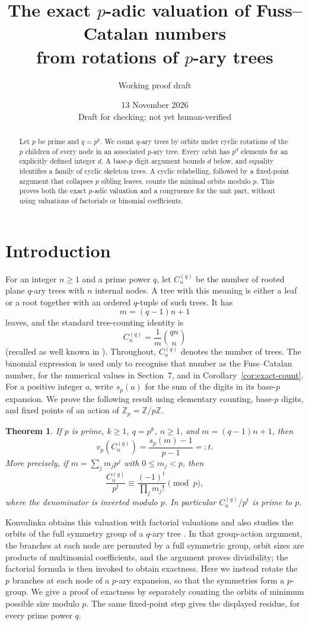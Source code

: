 \documentclass[11pt]{amsart}
\title[Tree rotations and Fuss--Catalan numbers]{The exact $p$-adic valuation of Fuss--Catalan numbers\\from rotations of $p$-ary trees}
\author{Working proof draft}
\date{13 November 2026\\\small Draft for checking; not yet human-verified}
\newtheorem{theorem}{Theorem}[section]
\theoremstyle{definition}
\theoremstyle{remark}
\newcommand{\Z}{\mathbb Z}
\newcommand{\fc}{C_n^{(q)}}
\begin{document}
\begin{abstract}
Let $p$ be prime and $q=p^k$.  We count $q$-ary trees by orbits under cyclic rotations of the $p$ children of every node in an associated $p$-ary tree.  Every orbit has $p^d$ elements for an explicitly defined integer $d$.  A base-$p$ digit argument bounds $d$ below, and equality identifies a family of cyclic skeleton trees.  A cyclic relabelling, followed by a fixed-point argument that collapses $p$ sibling leaves, counts the minimal orbits modulo $p$.  This proves both the exact $p$-adic valuation and a congruence for the unit part, without using valuations of factorials or binomial coefficients.
\end{abstract}
\maketitle
\tableofcontents

\section{Introduction}
For an integer $n\ge 1$ and a prime power $q$, let $\fc$ be the number of rooted plane $q$-ary trees with $n$ internal nodes.  A tree with this meaning is either a leaf or a root together with an ordered $q$-tuple of such trees.  It has
\[
 m=(q-1)n+1
\]
leaves, and the standard tree-counting identity is
\[
 \fc=\frac1m\binom{qn}{n}
\]
(recalled as well known in \cite{Konvalinka}).  Throughout, $\fc$ denotes the number of trees.  The binomial expression is used only to recognise that number as the Fuss--Catalan number, for the numerical values in Section~7, and in Corollary~\ref{cor:exact-count}.
For a positive integer $a$, write $s_p(a)$ for the sum of the digits in its base-$p$ expansion.  We prove the following result using elementary counting, base-$p$ digits, and fixed points of an action of $\Z_p=\Z/p\Z$.
\begin{theorem}\label{thm:main}
If $p$ is prime, $k\ge1$, $q=p^k$, $n\ge1$, and $m=(q-1)n+1$, then
\[
 v_p\!\left(\fc\right)=\frac{s_p(m)-1}{p-1}=:t.
\]
More precisely, if $m=\sum_jm_jp^j$ with $0\le m_j<p$, then
\[
 \frac{\fc}{p^t}\equiv \frac{(-1)^t}{\prod_jm_j!}
 \pmod p,
\]
where the denominator is inverted modulo $p$.  In particular $\fc/p^t$ is prime to $p$.
\end{theorem}
Konvalinka obtains this valuation with factorial valuations and also studies the orbits of the full symmetry group of a $q$-ary tree \cite{Konvalinka}.  In that group-action argument, the branches at each node are permuted by a full symmetric group, orbit sizes are products of multinomial coefficients, and the argument proves divisibility; the factorial formula is then invoked to obtain exactness.  Here we instead rotate the $p$ branches at each node of a $p$-ary expansion, so that the symmetries form a $p$-group.  We give a proof of exactness by separately counting the orbits of minimum possible size modulo $p$.  The same fixed-point step gives the displayed residue, for every prime power $q$.
\end{document}

